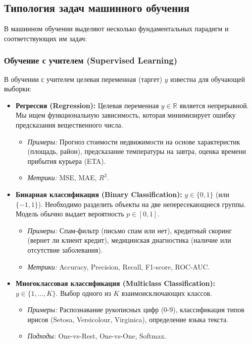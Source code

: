 \documentclass[12pt]{article}
\begin{document}
\subsection{Типология задач машинного обучения}
В машинном обучении выделяют несколько фундаментальных парадигм и соответствующих им задач:

\subsubsection{Обучение с учителем (Supervised Learning)}
В обучении с учителем целевая переменная (таргет) $y$ известна для обучающей выборки:

\begin{itemize}
    \item \textbf{Регрессия (Regression):} Целевая переменная $y \in \mathbb{R}$ является непрерывной. Мы ищем функциональную зависимость, которая минимизирует ошибку предсказания вещественного числа.
    \begin{itemize}
        \item \textit{Примеры:} Прогноз стоимости недвижимости на основе характеристик (площадь, район), предсказание температуры на завтра, оценка времени прибытия курьера (ETA).
        \item \textit{Метрики:} MSE, MAE, $R^2$.
    \end{itemize}

    \item \textbf{Бинарная классификация (Binary Classification):} $y \in \{0, 1\}$ (или $\{-1, 1\}$). Необходимо разделить объекты на две непересекающиеся группы. Модель обычно выдает вероятность $p \in [0, 1]$.
    \begin{itemize}
        \item \textit{Примеры:} Спам-фильтр (письмо спам или нет), кредитный скоринг (вернет ли клиент кредит), медицинская диагностика (наличие или отсутствие заболевания).
        \item \textit{Метрики:} Accuracy, Precision, Recall, F1-score, ROC-AUC.
    \end{itemize}

    \item \textbf{Многоклассовая классификация (Multiclass Classification):} $y \in \{1, \dots, K\}$. Выбор одного из $K$ взаимоисключающих классов.
    \begin{itemize}
        \item \textit{Примеры:} Распознавание рукописных цифр (0-9), классификация типов ирисов (Setosa, Versicolour, Virginica), определение языка текста.
        \item \textit{Подходы:} One-vs-Rest, One-vs-One, Softmax.
    \end{itemize}


\end{itemize}
\end{document}
